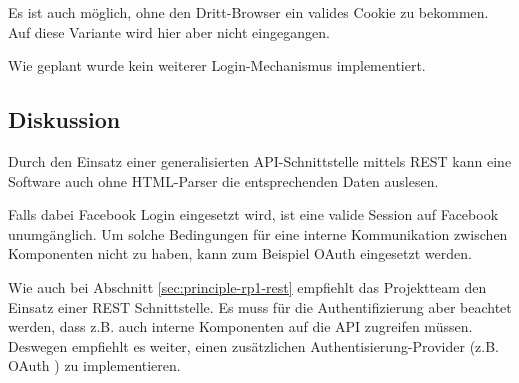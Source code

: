 Es ist auch möglich, ohne den Dritt-Browser ein valides Cookie zu bekommen. Auf diese Variante wird hier aber nicht eingegangen.

Wie geplant wurde kein weiterer Login-Mechanismus implementiert.

\subsection*{Diskussion}
Durch den Einsatz einer generalisierten API-Schnittstelle mittels REST kann eine Software auch ohne HTML-Parser die entsprechenden Daten auslesen.

Falls dabei Facebook Login eingesetzt wird, ist eine valide Session auf Facebook unumgänglich. Um solche Bedingungen für eine interne Kommunikation zwischen Komponenten nicht zu haben, kann zum Beispiel OAuth \cite{oauth} eingesetzt werden.

Wie auch bei Abschnitt \ref{sec:principle-rp1-rest} empfiehlt das Projektteam den Einsatz einer REST Schnittstelle. Es muss für die Authentifizierung aber beachtet werden, dass z.B. auch interne Komponenten auf die API zugreifen müssen. Deswegen empfiehlt es weiter, einen zusätzlichen Authentisierung-Provider (z.B. OAuth \cite{oauth}) zu implementieren.